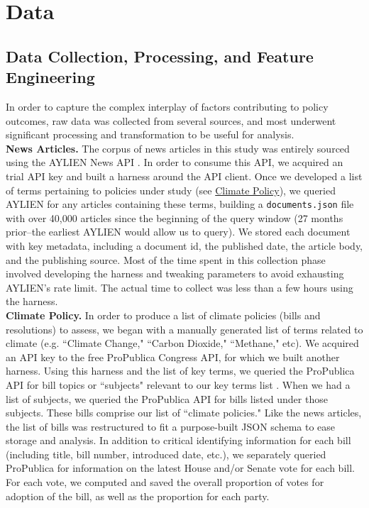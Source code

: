 \documentclass[letterpaper,11pt]{article}
\begin{document}

\section{Data}

\vspace{.1in}

\subsection{Data Collection, Processing, and Feature Engineering}
In order to capture the complex interplay of factors contributing to policy outcomes, raw data was collected from several sources, and most underwent significant processing and transformation to be useful for analysis.\\

\quad\textbf{News Articles.} The corpus of news articles in this study was entirely sourced using the AYLIEN News API \cite{aylien}. In order to consume this API, we acquired an trial API key and built a harness around the API client. Once we developed a list of terms pertaining to policies under study (see \hyperref[dcap:ClimatePol]{Climate Policy}), we queried AYLIEN for any articles containing these terms, building a \verb|documents.json| file with over 40,000 articles since the beginning of the query window (27 months prior--the earliest AYLIEN would allow us to query). We stored each document with key metadata, including a document id, the published date, the article body, and the publishing source. Most of the time spent in this collection phase involved developing the harness and tweaking parameters to avoid exhausting AYLIEN's rate limit. The actual time to collect was less than a few hours using the harness.\\

\textbf{Climate Policy.}\label{dcap:ClimatePol} In order to produce a list of climate policies (bills and resolutions) to assess, we began with a manually generated list of terms related to climate (e.g. ``Climate Change," ``Carbon Dioxide," ``Methane," etc). We acquired an API key to the free ProPublica Congress API, for which we built another harness. Using this harness and the list of key terms, we queried the ProPublica API for bill topics or ``subjects" relevant to our key terms list \cite{propublica_congress_api}. When we had a list of subjects, we queried the ProPublica API for bills listed under those subjects. These bills comprise our list of ``climate policies." Like the news articles, the list of bills was restructured to fit a purpose-built JSON schema to ease storage and analysis. In addition to critical identifying information for each bill (including title, bill number, introduced date, etc.), we separately queried ProPublica for information on the latest House and/or Senate vote for each bill. For each vote, we computed and saved the overall proportion of votes for adoption of the bill, as well as the proportion for each party.
\end{document}
